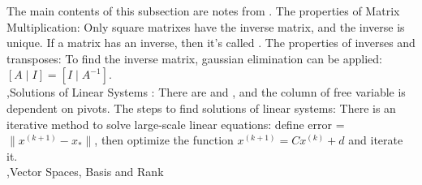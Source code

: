 \documentclass[10pt]{report}
\begin{document}
The main contents of this subsection are notes from \cite{deisenroth2020mathematics}.
The properties of Matrix Multiplication:
Only square matrixes have the inverse matrix, and the inverse is unique. If a matrix has an inverse, then it's called .
The properties of inverses and transposes:
To find the inverse matrix, gaussian elimination can be applied: $[A\mid I]=[I\mid A^{-1}]$.\\
\sep{Solutions of Linear Systems}
:
There are  and , and the column of free variable is dependent on pivots. The steps to find solutions of linear systems:
There is an iterative method to solve large-scale linear equations:
define error = $\|x^{(k+1)}-x_*\|$, then optimize the function $x^{(k+1)}=Cx^{(k)}+d$ and iterate it.\\
\sep{Vector Spaces, Basis and Rank}
\end{document}
